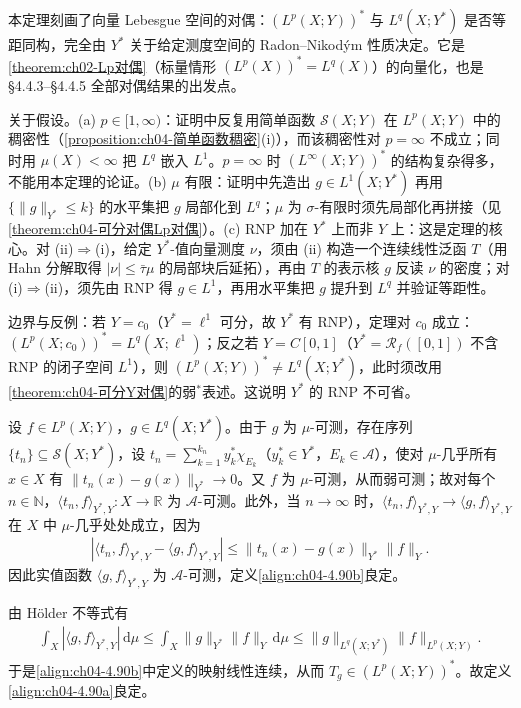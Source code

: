 \documentclass[../../main.tex]{subfiles}%
\begin{document}
\begin{remark}\label{remark:ch04-Lp对偶刻画}
本定理刻画了向量 Lebesgue 空间的对偶：$(L^p(X;Y))^*$ 与 $L^q(X;Y^*)$ 是否等距同构，完全由 $Y^*$ 关于给定测度空间的 Radon--Nikodým 性质决定。它是\cref{theorem:ch02-Lp对偶}（标量情形 $(L^p(X))^*=L^q(X)$）的向量化，也是 §4.4.3--§4.4.5 全部对偶结果的出发点。

关于假设。(a) $p\in[1,\infty)$：证明中反复用简单函数 $\mathcal{S}(X;Y)$ 在 $L^p(X;Y)$ 中的稠密性（\cref{proposition:ch04-简单函数稠密}(i)），而该稠密性对 $p=\infty$ 不成立；同时用 $\mu(X)<\infty$ 把 $L^q$ 嵌入 $L^1$。$p=\infty$ 时 $(L^\infty(X;Y))^*$ 的结构复杂得多，不能用本定理的论证。(b) $\mu$ 有限：证明中先造出 $g\in L^1(X;Y^*)$ 再用 $\{\|g\|_{Y^*}\leqslant k\}$ 的水平集把 $g$ 局部化到 $L^q$；$\mu$ 为 $\sigma$-有限时须先局部化再拼接（见\cref{theorem:ch04-可分对偶Lp对偶}）。(c) RNP 加在 $Y^*$ 上而非 $Y$ 上：这是定理的核心。对 (ii)$\Rightarrow$(i)，给定 $Y^*$-值向量测度 $\nu$，须由 (ii) 构造一个连续线性泛函 $T$（用 Hahn 分解取得 $|\nu|\leqslant\bar\tau\mu$ 的局部块后延拓），再由 $T$ 的表示核 $g$ 反读 $\nu$ 的密度；对 (i)$\Rightarrow$(ii)，须先由 RNP 得 $g\in L^1$，再用水平集把 $g$ 提升到 $L^q$ 并验证等距性。

边界与反例：若 $Y=c_0$（$Y^*=\ell^1$ 可分，故 $Y^*$ 有 RNP），定理对 $c_0$ 成立：$(L^p(X;c_0))^*=L^q(X;\ell^1)$；反之若 $Y=C[0,1]$（$Y^*=\mathscr{R}_f([0,1])$ 不含 RNP 的闭子空间 $L^1$），则 $(L^p(X;Y))^*\neq L^q(X;Y^*)$，此时须改用\cref{theorem:ch04-可分Y对偶}的弱$^*$表述。这说明 $Y^*$ 的 RNP 不可省。
\end{remark}

\begin{remark}\label{remark:ch04-对偶配对良定}
设 $f\in L^p(X;Y)$，$g\in L^q(X;Y^*)$。由于 $g$ 为 $\mu$-可测，存在序列 $\{t_n\}\subseteq\mathcal{S}(X;Y^*)$，设 $t_n=\sum_{k=1}^{k_n}y_k^*\chi_{E_k}$（$y_k^*\in Y^*$，$E_k\in\mathcal{A}$），使对 $\mu$-几乎所有 $x\in X$ 有 $\|t_n(x)-g(x)\|_{Y^*}\to0$。又 $f$ 为 $\mu$-可测，从而弱可测；故对每个 $n\in\mathbb{N}$，$\langle t_n,f\rangle_{Y^*,Y}:X\to\mathbb{R}$ 为 $\mathcal{A}$-可测。此外，当 $n\to\infty$ 时，$\langle t_n,f\rangle_{Y^*,Y}\to\langle g,f\rangle_{Y^*,Y}$ 在 $X$ 中 $\mu$-几乎处处成立，因为
\begin{align*}
|\langle t_n,f\rangle_{Y^*,Y}-\langle g,f\rangle_{Y^*,Y}|\leqslant\|t_n(x)-g(x)\|_{Y^*}\|f\|_Y.
\end{align*}
因此实值函数 $\langle g,f\rangle_{Y^*,Y}$ 为 $\mathcal{A}$-可测，定义\eqref{align:ch04-4.90b}良定。

由 Hölder 不等式有
\begin{align}
\int_X|\langle g,f\rangle_{Y^*,Y}|\,\mathrm{d}\mu\leqslant\int_X\|g\|_{Y^*}\|f\|_Y\,\mathrm{d}\mu\leqslant\|g\|_{L^q(X;Y^*)}\|f\|_{L^p(X;Y)}. \label{align:ch04-4.91}
\end{align}
于是\eqref{align:ch04-4.90b}中定义的映射线性连续，从而 $T_g\in(L^p(X;Y))^*$。故定义\eqref{align:ch04-4.90a}良定。
\end{remark}
\end{document}
